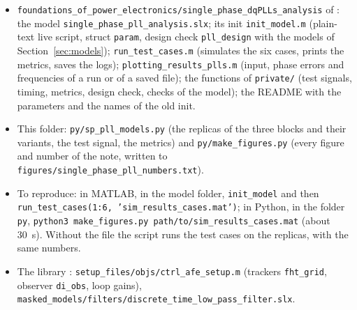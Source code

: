 \documentclass[11pt,a4paper]{scrartcl}
\newcommand{\code}[1]{\texttt{#1}}
\newcommand{\us}{\_\allowbreak}  %
\begin{document}
\begin{onehalfspace}
\begin{itemize}[nosep]
	\item \code{foundations\us of\us power\us electronics/\allowbreak single\us phase\us dqPLLs\us analysis} of \cite{model_repo}: the model \code{single\_phase\_pll\_analysis.slx}; its init \code{init\_model.m} (plain-text live script, struct \code{param}, design check \code{pll\_design} with the models of Section~\ref{sec:models}); \code{run\_test\_cases.m} (simulates the six cases, prints the metrics, saves the logs); \code{plotting\_results\_plls.m} (input, phase errors and frequencies of a run or of a saved file); the functions of \code{private/} (test signals, timing, metrics, design check, checks of the model); the README with the parameters and the names of the old init.
	\item This folder: \code{py/sp\_pll\_models.py} (the replicas of the three blocks and their variants, the test signal, the metrics) and \code{py/make\_figures.py} (every figure and number of the note, written to \code{figures/\allowbreak single\us phase\us pll\us numbers.txt}).
	\item To reproduce: in MATLAB, in the model folder, \code{init\_model} and then \code{run\us test\us cases(1:6, \allowbreak 'sim\us results\us cases.mat')}; in Python, in the folder \code{py}, \code{python3 make\us figures.py \allowbreak path/\allowbreak to/\allowbreak sim\us results\us cases.mat} (about \SI{30}{\second}). Without the file the script runs the test cases on the replicas, with the same numbers.
	\item The library \cite{library_repo}: \code{setup\_files/objs/ctrl\_afe\_setup.m} (trackers \code{fht\_grid}, observer \code{di\_obs}, loop gains), \code{masked\_models/filters/discrete\_time\_low\_pass\_filter.slx}.
\end{itemize}


\end{onehalfspace}
\end{document}
